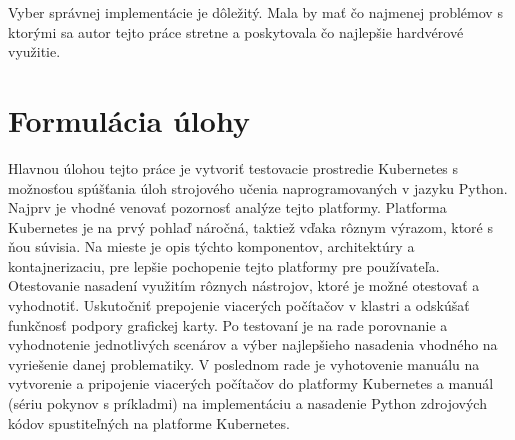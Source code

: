 Vyber správnej implementácie je dôležitý. Mala by mať čo najmenej problémov s ktorými sa autor tejto práce stretne a poskytovala čo najlepšie hardvérové využitie.

\section*{Formulácia úlohy}

Hlavnou úlohou tejto práce je vytvoriť testovacie prostredie Kubernetes s možnosťou spúšťania úloh strojového učenia naprogramovaných v jazyku Python. Najprv je vhodné venovať pozornosť analýze tejto platformy. Platforma Kubernetes je na prvý pohlaď náročná, taktiež vďaka rôznym výrazom, ktoré s ňou súvisia. Na mieste je opis týchto komponentov, architektúry a kontajnerizaciu, pre lepšie pochopenie tejto platformy pre používateľa. Otestovanie nasadení využitím rôznych nástrojov, ktoré je možné otestovať a vyhodnotiť. Uskutočniť prepojenie viacerých počítačov v klastri a odskúšať funkčnosť podpory grafickej karty. Po testovaní je na rade porovnanie a vyhodnotenie jednotlivých scenárov a výber najlepšieho nasadenia vhodného na vyriešenie danej problematiky. V poslednom rade je vyhotovenie manuálu na vytvorenie a pripojenie viacerých počítačov do platformy Kubernetes a manuál (sériu pokynov s príkladmi) na implementáciu a nasadenie Python zdrojových kódov spustiteľných na platforme Kubernetes.